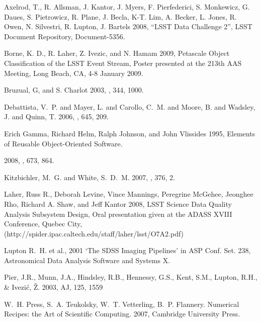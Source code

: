 \begin{thebibliography}{}

 Axelrod, T., R. Allsman,
  J. Kantor, J. Myers,  F. Pierfederici, S. Monkewicz, G. Daues,
  S. Pietrowicz, R. Plane, J. Becla, K-T. Lim, A. Becker, L. Jones,
  R. Owen, N. Silvestri, R. Lupton, J. Bartels 2008, ``LSST Data
  Challenge 2'', LSST Document Repository, Document-5356.

 Borne, K. D., R. Laher, Z. Ivezic, and N. Hamam 2009,
   Petascale Object Classification of the LSST Event Stream, 
   Poster presented at the 213th AAS Meeting, Long Beach, CA, 4-8
   January 2009.

 Bruzual, G, and
  S. Charlot 2003, \mnras, 344, 1000.

  {{Debattista}, V.~P. and {Mayer}, L. and {Carollo}, C.~M. and  
    {Moore}, B. and {Wadsley}, J. and {Quinn}, T.} 2006, \apj, 645, 209.

Erich Gamma, Richard Helm, Ralph Johnson, and John Vlissides 1995,
Elements of Reusable Object-Oriented Software.

 2008,
  \apj, 673, 864.

  {{Kitzbichler}, M.~G. and {White}, S.~D.~M.} 2007, \mnras, 376, 2.

 Laher, Russ R., Deborah Levine, Vince Mannings, 
   Peregrine McGehee, Jeonghee Rho, Richard A. Shaw, and Jeff Kantor 2008,
   LSST Science Data Quality Analysis Subsystem Design,
   Oral presentation given at the ADASS XVIII Conference, Quebec City, 
   (http://spider.ipac.caltech.edu/staff/laher/lsst/O7A2.pdf)

Lupton R.~H. et al., 2001 `The SDSS Imaging Pipelines' in
ASP Conf. Set. 238, Astronomical Data Analysis Software and Systems X.
   
 Pier, J.R., Munn, J.A., Hindsley, R.B., Hennessy, G.S.,
Kent, S.M., Lupton, R.H., \& Ivezi\'c, \v{Z}. 2003, AJ, 125, 1559

  W.~H. Press,  S.~A. Teukolsky, W.~T. Vetterling, B.~P. Flannery.
  Numerical Recipes: the Art of Scientific Computing.
  2007, Cambridge University Press.
   
\end{thebibliography}

